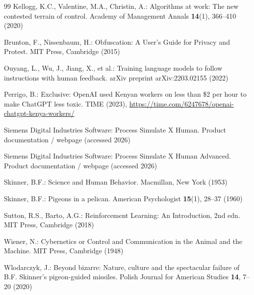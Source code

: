 \documentclass[11pt, a4paper]{article}
\begin{document}
\begin{thebibliography}{99}
Kellogg, K.C., Valentine, M.A., Christin, A.: Algorithms at work: The new contested terrain of control. Academy of Management Annals \textbf{14}(1), 366--410 (2020)

Brunton, F., Nissenbaum, H.: Obfuscation: A User's Guide for Privacy and Protest. MIT Press, Cambridge (2015)

Ouyang, L., Wu, J., Jiang, X., et al.: Training language models to follow instructions with human feedback. arXiv preprint arXiv:2203.02155 (2022)

Perrigo, B.: Exclusive: OpenAI used Kenyan workers on less than \$2 per hour to make ChatGPT less toxic. TIME (2023), \url{https://time.com/6247678/openai-chatgpt-kenya-workers/}

Siemens Digital Industries Software: Process Simulate X Human. Product documentation / webpage (accessed 2026)

Siemens Digital Industries Software: Process Simulate X Human Advanced. Product documentation / webpage (accessed 2026)

Skinner, B.F.: Science and Human Behavior. Macmillan, New York (1953)

Skinner, B.F.: Pigeons in a pelican. American Psychologist \textbf{15}(1), 28--37 (1960)

Sutton, R.S., Barto, A.G.: Reinforcement Learning: An Introduction, 2nd edn. MIT Press, Cambridge (2018)

Wiener, N.: Cybernetics or Control and Communication in the Animal and the Machine. MIT Press, Cambridge (1948)

Wlodarczyk, J.: Beyond bizarre: Nature, culture and the spectacular failure of B.F. Skinner's pigeon-guided missiles. Polish Journal for American Studies \textbf{14}, 7--20 (2020)

\end{thebibliography}
\end{document}
